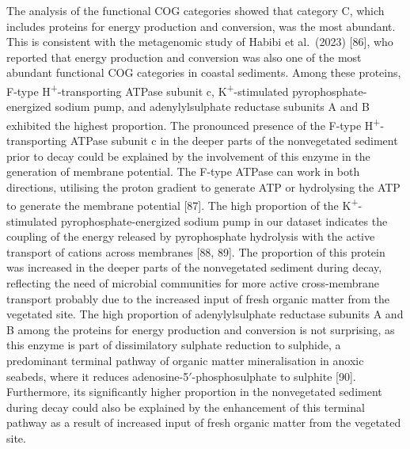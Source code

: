 \documentclass[
  12 pt,
]{article}
\begin{document}
The analysis of the functional COG categories showed that category C, which includes proteins for energy production and conversion, was the most abundant. This is consistent with the metagenomic study of Habibi et al.~(2023) {[}86{]}, who reported that energy production and conversion was also one of the most abundant functional COG categories in coastal sediments. Among these proteins, F-type H\textsuperscript{+}-transporting ATPase subunit c, K\textsuperscript{+}-stimulated pyrophosphate-energized sodium pump, and adenylylsulphate reductase subunits A and B exhibited the highest proportion. The pronounced presence of the F-type H\textsuperscript{+}-transporting ATPase subunit c in the deeper parts of the nonvegetated sediment prior to decay could be explained by the involvement of this enzyme in the generation of membrane potential. The F-type ATPase can work in both directions, utilising the proton gradient to generate ATP or hydrolysing the ATP to generate the membrane potential {[}87{]}. The high proportion of the K\textsuperscript{+}-stimulated pyrophosphate-energized sodium pump in our dataset indicates the coupling of the energy released by pyrophosphate hydrolysis with the active transport of cations across membranes {[}88, 89{]}. The proportion of this protein was increased in the deeper parts of the nonvegetated sediment during decay, reflecting the need of microbial communities for more active cross-membrane transport probably due to the increased input of fresh organic matter from the vegetated site. The high proportion of adenylylsulphate reductase subunits A and B among the proteins for energy production and conversion is not surprising, as this enzyme is part of dissimilatory sulphate reduction to sulphide, a predominant terminal pathway of organic matter mineralisation in anoxic seabeds, where it reduces adenosine-5\('\)-phosphosulphate to sulphite {[}90{]}. Furthermore, its significantly higher proportion in the nonvegetated sediment during decay could also be explained by the enhancement of this terminal pathway as a result of increased input of fresh organic matter from the vegetated site.
\end{document}
